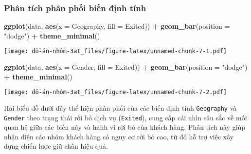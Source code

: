 \documentclass[
]{article}
\newenvironment{Shaded}{\begin{snugshade}}{\end{snugshade}}
\newcommand{\AttributeTok}[1]{\textcolor[rgb]{0.13,0.29,0.53}{#1}}
\newcommand{\FunctionTok}[1]{\textcolor[rgb]{0.13,0.29,0.53}{\textbf{#1}}}
\newcommand{\NormalTok}[1]{#1}
\newcommand{\SpecialCharTok}[1]{\textcolor[rgb]{0.81,0.36,0.00}{\textbf{#1}}}
\newcommand{\StringTok}[1]{\textcolor[rgb]{0.31,0.60,0.02}{#1}}
\begin{document}
\subsubsection{Phân tích phân phối biến định
tính}\label{sec-categorical-dist}

\begin{Shaded}
\begin{Highlighting}[]
\FunctionTok{ggplot}\NormalTok{(data, }\FunctionTok{aes}\NormalTok{(}\AttributeTok{x =}\NormalTok{ Geography, }\AttributeTok{fill =}\NormalTok{ Exited)) }\SpecialCharTok{+} \FunctionTok{geom\_bar}\NormalTok{(}\AttributeTok{position =} \StringTok{"dodge"}\NormalTok{) }\SpecialCharTok{+} \FunctionTok{theme\_minimal}\NormalTok{()}
\end{Highlighting}
\end{Shaded}

\texttt{[image: đồ-án-nhóm-3at\_files/figure-latex/unnamed-chunk-7-1.pdf]}

\begin{Shaded}
\begin{Highlighting}[]
\FunctionTok{ggplot}\NormalTok{(data, }\FunctionTok{aes}\NormalTok{(}\AttributeTok{x =}\NormalTok{ Gender, }\AttributeTok{fill =}\NormalTok{ Exited)) }\SpecialCharTok{+} \FunctionTok{geom\_bar}\NormalTok{(}\AttributeTok{position =} \StringTok{"dodge"}\NormalTok{) }\SpecialCharTok{+} \FunctionTok{theme\_minimal}\NormalTok{()}
\end{Highlighting}
\end{Shaded}

\texttt{[image: đồ-án-nhóm-3at\_files/figure-latex/unnamed-chunk-7-2.pdf]}

Hai biểu đồ dưới đây thể hiện phân phối của các biến định tính
\texttt{Geography} và \texttt{Gender} theo trạng thái rời bỏ dịch vụ
(\texttt{Exited}), cung cấp cái nhìn sâu sắc về mối quan hệ giữa các
biến này và hành vi rời bỏ của khách hàng. Phân tích này giúp nhận diện
các nhóm khách hàng có nguy cơ rời bỏ cao, từ đó hỗ trợ việc xây dựng
chiến lược giữ chân hiệu quả.
\end{document}
